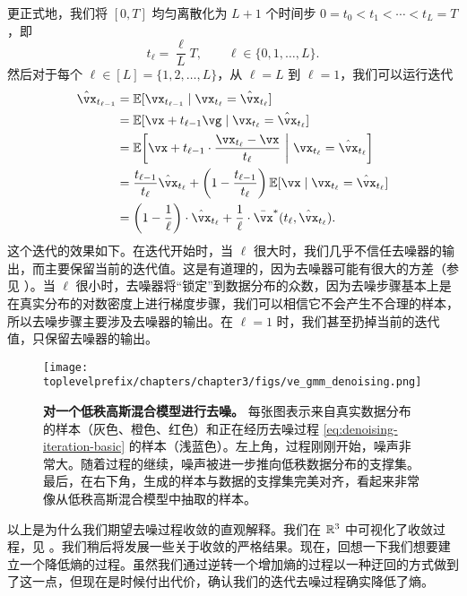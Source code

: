 \documentclass[../../book-main.tex]{subfiles}
\begin{document}
更正式地，我们将 \([0, T]\) 均匀离散化为 \(L + 1\) 个时间步 \(0 = t_{0} < t_{1} < \cdots < t_{L} = T\)，即
\begin{equation}
	t_{\ell} = \frac{\ell}{L}T, \qquad \ell \in \{0, 1, \dots, L\}.
\end{equation}
然后对于每个 \(\ell \in [L] = \{1, 2, \dots, L\}\)，从 \(\ell = L\) 到 \(\ell = 1\)，我们可以运行迭代
\begin{align}
	\hat{\vx}_{t_{\ell - 1}}
	&= \Ex[\vx_{t_{\ell - 1}} \mid \vx_{t_{\ell}} = \hat{\vx}_{t_{\ell}}] \\
	&= \Ex[\vx + t_{\ell - 1}\vg \mid \vx_{t_{\ell}} = \hat{\vx}_{t_{\ell}}] \\
	&= \Ex\rs{\vx + t_{\ell - 1}\cdot\frac{\vx_{t_{\ell}} - \vx}{t_{\ell}} \given \vx_{t_{\ell}} = \hat{\vx}_{t_{\ell}}} \\
	&= \frac{t_{\ell - 1}}{t_{\ell}}\hat{\vx}_{t_{\ell}} + \bp{1 - \frac{t_{\ell - 1}}{t_{\ell}}}\Ex[\vx \mid \vx_{t_{\ell}} = \hat{\vx}_{t_{\ell}}] \\
	&= \bp{1 - \frac{1}{\ell}}\cdot\hat{\vx}_{t_{\ell}} + \frac{1}{\ell}\cdot\bar{\vx}^{\ast}(t_{\ell}, \hat{\vx}_{t_{\ell}}).
\end{align}
这个迭代的效果如下。在迭代开始时，当 \(\ell\) 很大时，我们几乎不信任去噪器的输出，而主要保留当前的迭代值。这是有道理的，因为去噪器可能有很大的方差（参见 ）。当 \(\ell\) 很小时，去噪器将“锁定”到数据分布的众数，因为去噪步骤基本上是在真实分布的对数密度上进行梯度步骤，我们可以相信它不会产生不合理的样本，所以去噪步骤主要涉及去噪器的输出。在 \(\ell = 1\) 时，我们甚至扔掉当前的迭代值，只保留去噪器的输出。

\begin{figure}[t]
	\centering
	\texttt{[image: \\toplevelprefix/chapters/chapter3/figs/ve\_gmm\_denoising.png]}
	\caption{\small\textbf{对一个低秩高斯混合模型进行去噪。} 每张图表示来自真实数据分布的样本（灰色、橙色、红色）和正在经历去噪过程 \eqref{eq:denoising-iteration-basic} 的样本（浅蓝色）。左上角，过程刚刚开始，噪声非常大。随着过程的继续，噪声被进一步推向低秩数据分布的支撑集。最后，在右下角，生成的样本与数据的支撑集完美对齐，看起来非常像从低秩高斯混合模型中抽取的样本。}
	\label{fig:ve_gmm_denoising}
\end{figure}

以上是为什么我们期望去噪过程收敛的直观解释。我们在 \(\mathbb{R}^{3}\) 中可视化了收敛过程，见 。我们稍后将发展一些关于收敛的严格结果。现在，回想一下我们想要建立一个降低熵的过程。虽然我们通过逆转一个增加熵的过程以一种迂回的方式做到了这一点，但现在是时候付出代价，确认我们的迭代去噪过程确实降低了熵。
\end{document}
